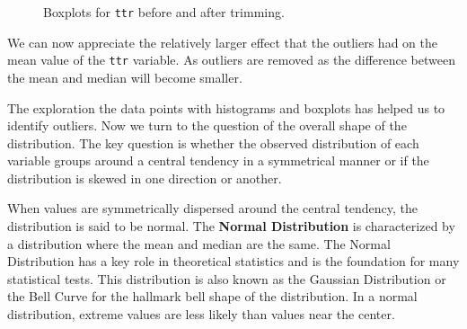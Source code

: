 \documentclass[
  letterpaper,
  DIV=11,
  numbers=noendperiod]{scrreprt}
\theoremstyle{definition}
\theoremstyle{remark}
\begin{document}
\begin{figure}[H]

\begin{minipage}{0.50\linewidth}



\end{minipage}%
%
\begin{minipage}{0.50\linewidth}



\end{minipage}%

\caption{\label{fig-aa-belc-boxplot-trimmed}Boxplots for \texttt{ttr}
before and after trimming.}

\end{figure}%

We can now appreciate the relatively larger effect that the outliers had
on the mean value of the \texttt{ttr} variable. As outliers are removed
as the difference between the mean and median will become smaller.

The exploration the data points with histograms and boxplots has helped
us to identify outliers. Now we turn to the question of the overall
shape of the distribution. The key question is whether the observed
distribution of each variable groups around a central tendency in a
symmetrical manner or if the distribution is skewed in one direction or
another.

When values are symmetrically dispersed around the central tendency, the
distribution is said to be normal. The \textbf{Normal Distribution} is
characterized by a distribution where the mean and median are the same.
The Normal Distribution has a key role in theoretical statistics and is
the foundation for many statistical tests. This distribution is also
known as the Gaussian Distribution or the Bell Curve for the hallmark
bell shape of the distribution. In a normal distribution, extreme values
are less likely than values near the center.
\end{document}
